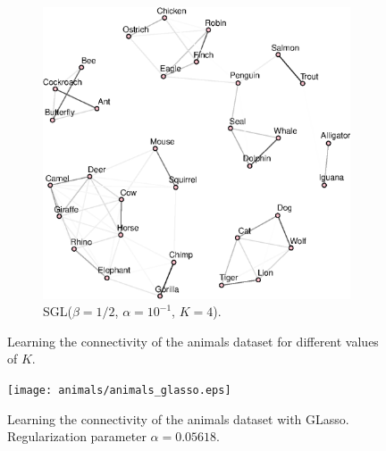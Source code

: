 \begin{figure}[!htb]
\begin{subfigure}[b]{0.475\textwidth}
      \includegraphics[width=\textwidth]{animals/graphs_for_different_k/animals_graph_k4.eps}
      \caption{\textsf{SGL}($\beta = 1/2$, $\alpha = 10^{-1}$, $K = 4$).}
    \end{subfigure}
    \caption{Learning the connectivity of the \textsf{animals} dataset for different values of $K$.}
    \label{fig:animals}
\end{figure}

\begin{figure}
  \centering
  \texttt{[image: animals/animals\_glasso.eps]}
  \caption{Learning the connectivity of the \textsf{animals} dataset with \textsf{GLasso}.
           Regularization parameter $\alpha = 0.05618$.}
  \label{fig:animals-glasso}
\end{figure}
